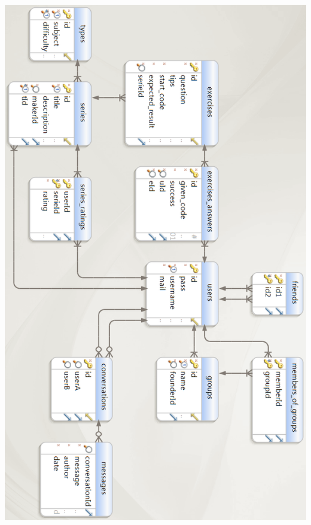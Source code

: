 \mbox{\hspace{-6ex}\includegraphics[keepaspectratio=true, angle=90, scale=0.33]{raport_files/design/UML.png}}

